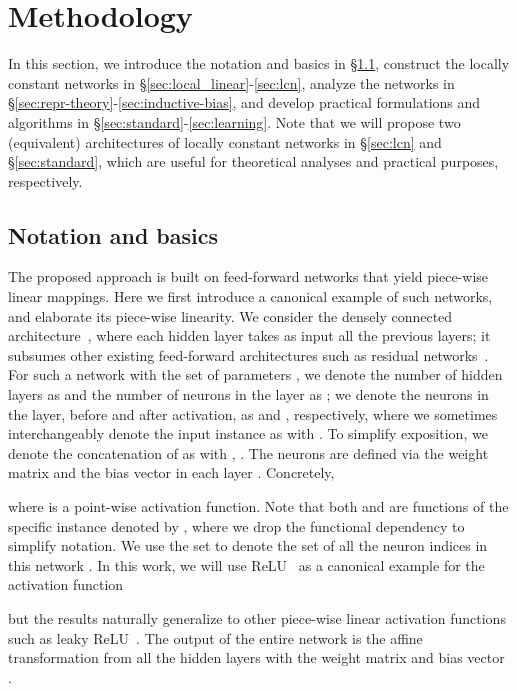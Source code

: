 \documentclass{article} \usepackage{iclr2020_conference,times}
\newcommand{\xref}[1]{\S\ref{#1}}
\begin{document}
%
 \vspace{-1mm}
\section{Methodology}
\vspace{-1mm}
In this section, we introduce the notation and basics in \xref{sec:notation}, construct the locally constant networks in \xref{sec:local_linear}-\ref{sec:lcn}, analyze the networks in \xref{sec:repr-theory}-\ref{sec:inductive-bias}, and develop practical formulations and algorithms in \xref{sec:standard}-\ref{sec:learning}. Note that we will propose two (equivalent) architectures of locally constant networks in \xref{sec:lcn} and \xref{sec:standard}, which are useful for theoretical analyses and practical purposes, respectively. 



\subsection{Notation and basics}\label{sec:notation}

The proposed approach is built on feed-forward networks that yield piece-wise linear mappings. Here we first introduce a canonical example of such networks, and elaborate its piece-wise linearity. We consider the densely connected architecture~\citep{huang2017densely}, where each hidden layer takes as input all the previous layers; it subsumes other existing feed-forward architectures such as residual networks~\citep{he2016deep}. For such a network  with the set of parameters , we denote the number of hidden layers as  and the number of neurons in the  layer as ; we denote the neurons in the  layer, before and after activation, as  and , respectively, where we sometimes interchangeably denote the input instance  as  with . To simplify exposition, we denote the concatenation of  as  with , . The neurons are defined via the weight matrix  and the bias vector  in each layer . Concretely,

where  is a point-wise activation function. Note that both  and  are functions of the specific instance denoted by , where we drop the functional dependency to simplify notation. We use the set  to denote the set of all the neuron indices in this network . In this work, we will use ReLU~\citep{nair2010rectified} as a canonical example for the activation function

but the results naturally generalize to other piece-wise linear activation functions such as leaky ReLU~\citep{maas2013rectifier}. The output of the entire network  is the affine transformation from all the hidden layers  with the weight matrix  and bias vector . 
 \vspace{-1mm}
\end{document}
